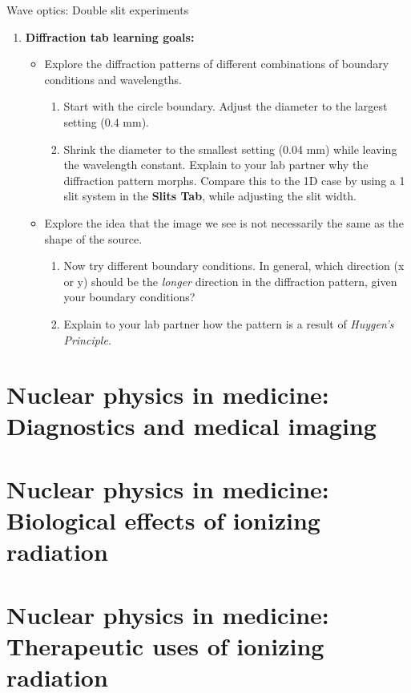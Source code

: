 \documentclass{beamer}
\begin{document}
\begin{frame}{Wave optics: Double slit experiments}
\footnotesize
\begin{enumerate}
\item \textbf{Diffraction tab learning goals:}
\begin{itemize}
\footnotesize
\item Explore the diffraction patterns of different combinations of boundary conditions and wavelengths.
\begin{enumerate}
\item Start with the circle boundary.  Adjust the diameter to the largest setting (0.4 mm).
\item Shrink the diameter to the smallest setting (0.04 mm) while leaving the wavelength constant.  Explain to your lab partner why the diffraction pattern morphs.  Compare this to the 1D case by using a 1 slit system in the \textbf{Slits Tab}, while adjusting the slit width.
\end{enumerate}
\item Explore the idea that the image we see is not necessarily the same as the shape of the source.
\begin{enumerate}
\item Now try different boundary conditions. In general, which direction (x or y) should be the \textit{longer} direction in the diffraction pattern, given your boundary conditions?
\item Explain to your lab partner how the pattern is a result of \textit{Huygen's Principle.}
\end{enumerate}
\end{itemize}
\end{enumerate}
\end{frame}

\section{Nuclear physics in medicine: Diagnostics and medical imaging}

\section{Nuclear physics in medicine: Biological effects of ionizing radiation}

\section{Nuclear physics in medicine: Therapeutic uses of ionizing radiation}
\end{document}
